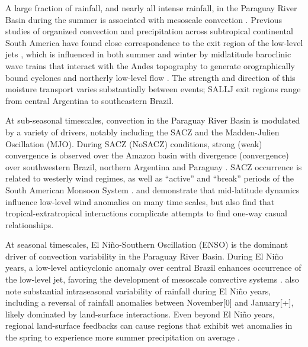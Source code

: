 \documentclass[twocol]{ametsoc}
\begin{document}
A large fraction of rainfall, and nearly all intense rainfall, in the Paraguay River Basin during the summer is associated with mesoscale convection \citep{Velasco1987}.
Previous studies of organized convection and precipitation across subtropical continental South America have found close correspondence to the exit region of the low-level jets \citep{Saulo:2007km,Salio:2007gd,Marengo2004,Velasco1987}, which is influenced in both summer and winter by midlatitude baroclinic wave trains that interact with the Andes topography to generate orographically bound cyclones and northerly low-level flow \citep{Campetella:2002hx,Seluchi:2006bi,Boers:2014gt}.
The strength and direction of this moisture transport varies substantially between events; SALLJ exit regions range from central Argentina \citep[``Chaco Jet Events'';][]{Salio:2002ev} to southeastern Brazil.

At sub-seasonal timescales, convection in the Paraguay River Basin is modulated by a variety of drivers, notably including the SACZ and the Madden-Julien Oscillation (MJO).
During SACZ (NoSACZ) conditions, strong (weak) convergence is observed over the Amazon basin with divergence (convergence) over southwestern Brazil, northern Argentina and Paraguay \citep{Herdies:2002jy,Carvalho2010}.
SACZ occurrence is related to westerly wind regimes, as well as ``active'' and ``break'' periods of the South American Monsoon System \citep{Marengo2004}.
\citet{Carvalho2004} and \citet{Jones2002} demonstrate that mid-latitude dynamics influence low-level wind anomalies on many time scales, but also find that tropical-extratropical interactions complicate attempts to find one-way casual relationships.

At seasonal timescales, El Ni\~no-Southern Oscillation (ENSO) is the dominant driver of convection variability in the Paraguay River Basin.
During El Ni\~no years, a low-level anticyclonic anomaly over central Brazil enhances occurrence of the low-level jet, favoring the development of mesoscale convective systems \citep{Velasco1987}. %
\citet{Grimm2009,Grimm2003} also note substantial intraseasonal variability of rainfall during El Ni\~no years, including a reversal of rainfall anomalies between November[0] and January[+], likely dominated by land-surface interactions.
Even beyond El Ni\~no years, regional land-surface feedbacks can cause regions that exhibit wet anomalies in the spring to experience more summer precipitation on average \citep{Grimm:2009bq}.
\end{document}
